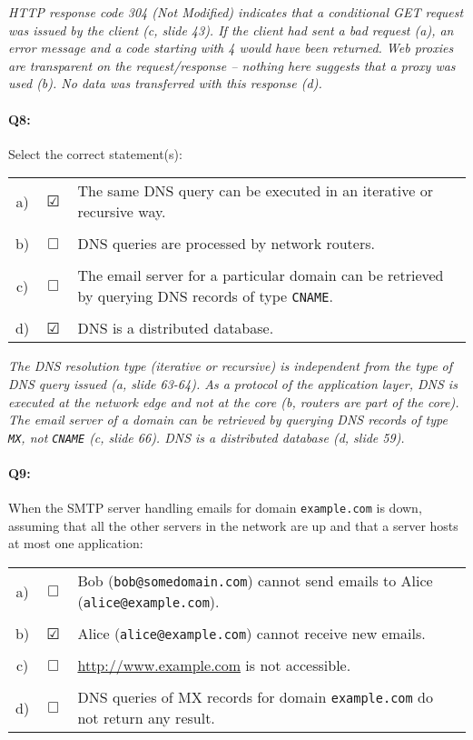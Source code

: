 \documentclass{llncs}
\newcommand{\answer}[1]{{\color{red}\textit{#1}\color{black}}}
\begin{document}
\answer{HTTP response code 304 (Not Modified) indicates that a
  conditional GET request was issued by the client (c, slide 43). If
  the client had sent a bad request (a), an error message and a code
  starting with 4 would have been returned. Web proxies are
  transparent on the request/response -- nothing here suggests that
  a proxy was used (b). No data was transferred with this response (d).}

\paragraph{\textbf{Q8:}}
Select the correct statement(s):

\begin{tabular}{ccl}
  a) & $\CheckedBox$ & The same DNS query can be executed in an iterative or recursive way.\\
  \\
  b) & $\Box$ & DNS queries are processed by network routers.\\
  \\
  c) & $\Box$ & The email server for a particular domain can be retrieved by querying DNS records of type \texttt{CNAME}.\\
  \\
  d) & $\CheckedBox$ & DNS is a distributed database.
\end{tabular}

\answer{The DNS resolution type (iterative or recursive) is
  independent from the type of DNS query issued (a, slide 63-64). As a
  protocol of the application layer, DNS is executed at the network
  edge and not at the core (b, routers are part of the core). The
  email server of a domain can be retrieved by querying DNS records of
  type \texttt{MX}, not \texttt{CNAME} (c, slide 66). DNS is a
  distributed database (d, slide 59).}

\paragraph{\textbf{Q9:}}
When the SMTP server handling emails for domain \texttt{example.com}
is down, assuming  that all the other servers in the network are up and that a server hosts at most one application:

\begin{tabular}{ccl}
  a) & $\Box$ & Bob (\texttt{bob@somedomain.com}) cannot send emails to Alice (\texttt{alice@example.com}). \\
  \\
  b) & $\CheckedBox$ & Alice (\texttt{alice@example.com}) cannot receive new emails.\\
  \\
  c) & $\Box$ & \url{http://www.example.com} is not accessible.\\
  \\
  d) & $\Box$ & DNS queries of MX records for domain \texttt{example.com} do not return any result.
\end{tabular}
\end{document}
